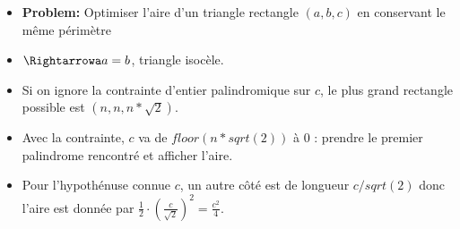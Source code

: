 \begin{frame}
    \frametitle{\problemtitle}
    \begin{itemize}
        \item<+-> \textbf{Problem:} Optimiser l'aire d'un triangle rectangle $(a,b,c)$ en conservant le même périmètre
        \item<+-> $\Rightarrowa a=b$, triangle isocèle.
        \item<+-> Si on ignore la contrainte d'entier palindromique sur $c$, le plus grand rectangle possible est $(n,n,n*\sqrt{2})$.
        \item<+-> Avec la contrainte, $c$ va de $floor(n*sqrt(2))$ à $0$ : prendre le premier palindrome rencontré et afficher l'aire.
        \item<+-> Pour l'hypothénuse connue $c$, un autre côté est de longueur $c/sqrt(2)$ donc l'aire est donnée par $\frac{1}{2}\cdot(\frac{c}{\sqrt{2}})^2 = \frac{c^2}{4}$.

    \end{itemize}
\end{frame}

